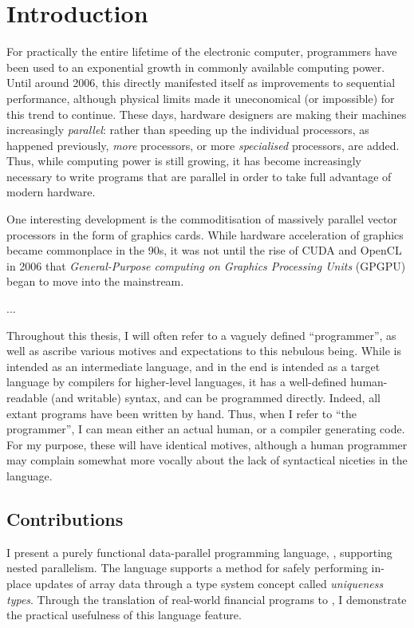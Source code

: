\chapter{Introduction}

For practically the entire lifetime of the electronic computer,
programmers have been used to an exponential growth in commonly
available computing power.  Until around 2006, this directly
manifested itself as improvements to sequential performance, although
physical limits made it uneconomical (or impossible) for this trend to
continue.  These days, hardware designers are making their machines
increasingly \textit{parallel}: rather than speeding up the individual
processors, as happened previously, \textit{more} processors, or more
\textit{specialised} processors, are added.  Thus, while computing
power is still growing, it has become increasingly necessary to write
programs that are parallel in order to take full advantage of modern
hardware.

One interesting development is the commoditisation of massively
parallel vector processors in the form of graphics cards.  While
hardware acceleration of graphics became commonplace in the 90s, it
was not until the rise of CUDA and OpenCL in 2006 that
\textit{General-Purpose computing on Graphics Processing Units}
(GPGPU) began to move into the mainstream.

... 

Throughout this thesis, I will often refer to a vaguely defined
``programmer'', as well as ascribe various motives and expectations to
this nebulous being.  While \LO{} is intended as an intermediate
language, and in the end is intended as a target language by compilers
for higher-level languages, it has a well-defined human-readable (and
writable) syntax, and can be programmed directly.  Indeed, all extant
\LO{} programs have been written by hand.  Thus, when I refer to ``the
programmer'', I can mean either an actual human, or a compiler
generating \LO{} code.  For my purpose, these will have identical
motives, although a human programmer may complain somewhat more
vocally about the lack of syntactical niceties in the language.

\section{Contributions}

I present a purely functional data-parallel programming language,
\LO{}, supporting nested parallelism.  The language supports a method
for safely performing in-place updates of array data through a type
system concept called \textit{uniqueness types}.  Through the
translation of real-world financial programs to \LO{}, I demonstrate
the practical usefulness of this language feature.

